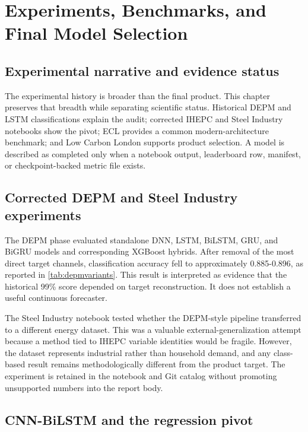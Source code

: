\chapter{Experiments, Benchmarks, and Final Model Selection}
\label{chap:experiments}

\section{Experimental narrative and evidence status}

The experimental history is broader than the final product. This chapter preserves that breadth while separating scientific status. Historical DEPM and LSTM classifications explain the audit; corrected IHEPC and Steel Industry notebooks show the pivot; ECL provides a common modern-architecture benchmark; and Low Carbon London supports product selection. A model is described as completed only when a notebook output, leaderboard row, manifest, or checkpoint-backed metric file exists.

\section{Corrected DEPM and Steel Industry experiments}

The DEPM phase evaluated standalone DNN, LSTM, BiLSTM, GRU, and BiGRU models and corresponding XGBoost hybrids. After removal of the most direct target channels, classification accuracy fell to approximately 0.885-0.896, as reported in \cref{tab:depmvariants}. This result is interpreted as evidence that the historical 99\% score depended on target reconstruction. It does not establish a useful continuous forecaster.

The Steel Industry notebook tested whether the DEPM-style pipeline transferred to a different energy dataset. This was a valuable external-generalization attempt because a method tied to IHEPC variable identities would be fragile. However, the dataset represents industrial rather than household demand, and any class-based result remains methodologically different from the product target. The experiment is retained in the notebook and Git catalog without promoting unsupported numbers into the report body.

\section{CNN-BiLSTM and the regression pivot}


